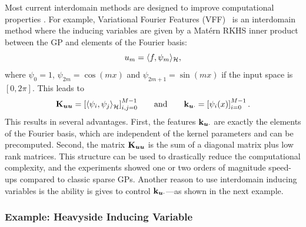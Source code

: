 Most current interdomain methods are designed to improve computational properties \citep{hensman2017variational,Dutordoir2020spherical,burt2020variational}. For example, Variational Fourier Features (VFF)~\citep{hensman2017variational} is an interdomain method where the inducing variables are given by a Mat\'ern RKHS inner product between the GP and elements of the Fourier basis:
\begin{equation*}
u_m = \langle f, \psi_m \rangle_{{\mathcal{H}}},
\end{equation*}
where $\psi_0 = 1$, $\psi_{2m}=\cos(m x)$ and $\psi_{2m+1}=\sin(m x)$ if the input space is $[0, 2 \pi]$. This leads to
\begin{equation*}
    \Kuu = \left[\langle \psi_i , \psi_{j} \rangle_\rkhs^{} \right]_{i, j = 0}^{M-1}\qquad\text{and}\qquad\kux = \left[ \psi_i(x)\right]_{i = 0}^{M-1}\, .
\end{equation*}
This results in several advantages. First, the features $\mathbf{k}_{\bm{u} \cdot}$ are exactly the elements of the Fourier basis, which are independent of the kernel parameters and can be precomputed. Second, the matrix $\mathbf{{K}}_{\bm{u} \bm{u}}$ is the sum of a diagonal matrix plus low rank matrices. This structure can be used to drastically reduce the computational complexity, and the experiments showed one or two orders of magnitude speed-ups compared to classic sparse GPs. Another reason to use interdomain inducing variables is the ability is gives to control $\mathbf{k}_{\bm{u} \cdot}$---as shown in the next example.

\subsubsection*{Example: Heavyside Inducing Variable}


